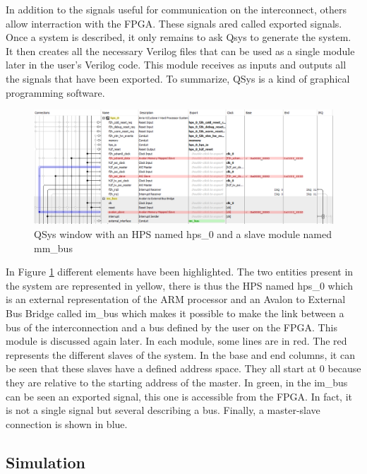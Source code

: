 In addition to the signals useful for communication on the interconnect, others allow interraction 
with the FPGA. These signals ared called exported signals. Once a system is described, it only
remains to ask Qsys to generate the system. It then creates all the necessary Verilog files that 
can be used as a single module later in the user's Verilog code. This module receives as inputs and 
outputs all the signals that have been exported. To summarize, QSys is a kind of graphical 
programming software.

\begin{figure}[H]
    \centering
    \includegraphics[width=\linewidth]{Chapter2-FPGA_Flow/res/qsys.PNG}
    \caption{QSys window with an HPS named hps\_0 and a slave module named mm\_bus}
    \label{fig:tools/qsys}
\end{figure}

In Figure \ref{fig:tools/qsys} different elements have been highlighted. The two entities present in the system are 
represented in yellow, there is thus the HPS named hps\_0 which is an external representation of the 
ARM processor and an Avalon to External Bus Bridge called im\_bus which makes it possible to make 
the link between a bus of the interconnection and a bus defined by the user on the FPGA. This module 
is discussed again later. In each module, some lines are in red. The red represents the 
different slaves of the system. In the base and end columns, it can be seen that these slaves have 
a defined address space. They all start at 0 because they are relative to the starting address of 
the master. In green, in the im\_bus can be seen an exported signal, this one is accessible 
from the FPGA. In fact, it is not a single signal but several describing a bus. Finally, a 
master-slave connection is shown in blue.

\subsection{Simulation}

